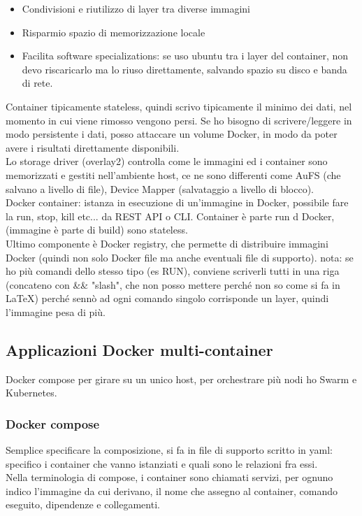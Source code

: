 \documentclass[16px]{article}
\begin{document}
\begin{itemize}
\item Condivisioni e riutilizzo di layer tra diverse immagini
\item Risparmio spazio di memorizzazione locale
\item Facilita software specializations: se uso ubuntu tra i layer del container, non devo riscaricarlo ma lo riuso direttamente,  salvando spazio su disco e banda di rete.
\end{itemize}
Container tipicamente stateless, quindi scrivo tipicamente il minimo dei dati, nel momento in cui viene rimosso vengono persi. Se ho bisogno di scrivere/leggere in modo persistente i dati, posso attaccare un volume Docker, in modo da poter avere i risultati direttamente disponibili.\\ Lo storage driver (overlay2) controlla come le immagini ed i container sono memorizzati e gestiti nell'ambiente host, ce ne sono differenti come AuFS (che salvano a livello di file), Device Mapper (salvataggio a livello di blocco).\\ Docker container: istanza in esecuzione di un'immagine in Docker, possibile fare la run, stop, kill etc... da REST API o CLI. Container è parte run d Docker, (immagine è parte di build) sono stateless.\\ Ultimo componente è Docker registry, che permette di distribuire immagini Docker (quindi non solo Docker file ma anche eventuali file di supporto).
nota: se ho più comandi dello stesso tipo (es RUN), conviene scriverli tutti in una riga (concateno con \&\& "slash", che non posso mettere perché non so come si fa in LaTeX) perché sennò ad ogni comando singolo corrisponde un layer, quindi l'immagine pesa di più.
\subsection{Applicazioni Docker multi-container}
Docker compose per girare su un unico host, per orchestrare più nodi ho Swarm e Kubernetes.
\subsubsection{Docker compose}
Semplice specificare la composizione, si fa in file di supporto scritto in yaml: specifico i container che vanno istanziati e quali sono le relazioni fra essi.\\  Nella terminologia di compose, i container sono chiamati servizi, per ognuno indico l'immagine da cui derivano, il nome che assegno al container, comando eseguito, dipendenze e collegamenti.
\end{document}
